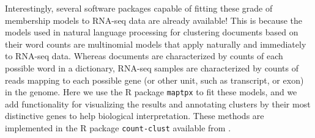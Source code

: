 Interestingly, several software packages capable of fitting these grade of membership models to RNA-seq data are already available! This is because
the models used in natural language processing for clustering documents based on their word counts are multinomial models that
apply naturally and immediately to RNA-seq data. Whereas documents are characterized by counts of each possible word in a dictionary, RNA-seq samples
are characterized by counts of reads mapping to each possible gene (or other unit, such as transcript, or exon) in the genome. 
Here we use the R package {\tt maptpx} \cite{taddy} to fit these models, and we add functionality for visualizing the results and annotating
clusters by their most distinctive genes to help biological interpretation. These methods are implemented in the R package {\tt count-clust} available
from \url{}.  











